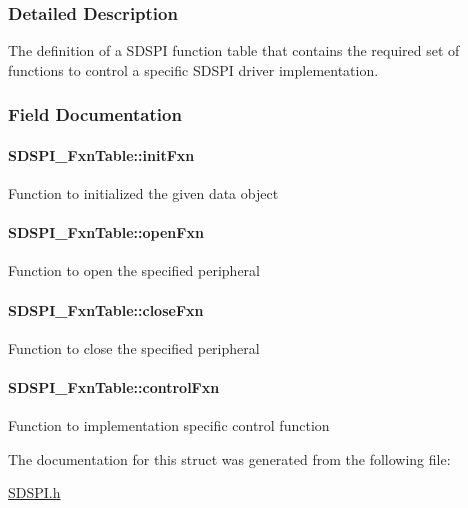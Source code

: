 \subsubsection{Detailed Description}
The definition of a S\+D\+S\+P\+I function table that contains the required set of functions to control a specific S\+D\+S\+P\+I driver implementation. 

\subsubsection{Field Documentation}
\paragraph[{init\+Fxn}]{ S\+D\+S\+P\+I\+\_\+\+Fxn\+Table\+::init\+Fxn}\label{struct_s_d_s_p_i___fxn_table_ac593f7347a7b145179fec8e4160816d2}
Function to initialized the given data object 
\paragraph[{open\+Fxn}]{ S\+D\+S\+P\+I\+\_\+\+Fxn\+Table\+::open\+Fxn}\label{struct_s_d_s_p_i___fxn_table_a822c1861740700d5cc489d063552e9e3}
Function to open the specified peripheral 
\paragraph[{close\+Fxn}]{ S\+D\+S\+P\+I\+\_\+\+Fxn\+Table\+::close\+Fxn}\label{struct_s_d_s_p_i___fxn_table_a13d86b2434f6e60f14a3926f97101c2c}
Function to close the specified peripheral 
\paragraph[{control\+Fxn}]{ S\+D\+S\+P\+I\+\_\+\+Fxn\+Table\+::control\+Fxn}\label{struct_s_d_s_p_i___fxn_table_a613920b0aee49813c55c892c73d0aec0}
Function to implementation specific control function 

The documentation for this struct was generated from the following file\+:\begin{DoxyCompactItemize}
\item 
\hyperlink{_s_d_s_p_i_8h}{S\+D\+S\+P\+I.\+h}\end{DoxyCompactItemize}

